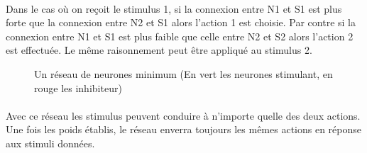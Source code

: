 \paragraph{}
Dans le cas où on reçoit le stimulus 1, si la connexion entre N1 et S1 est
plus forte que la connexion entre N2 et S1 alors l'action 1 est choisie. 
Par contre si la connexion entre N1 et S1 est plus faible que celle entre 
N2 et S2 alors l'action 2 est effectuée. Le même raisonnement peut être 
appliqué au stimulus 2.

\begin{figure}[!h]
  \begin{center}
    
  \end{center}
  \caption{Un réseau de neurones minimum (En vert les neurones stimulant, en rouge les inhibiteur)}
  \label{reseau2}
\end{figure}

\paragraph{}
Avec ce réseau les stimulus peuvent conduire à n'importe quelle des deux
actions. Une fois les poids établis, le réseau enverra toujours les mêmes
actions en réponse aux stimuli données.
